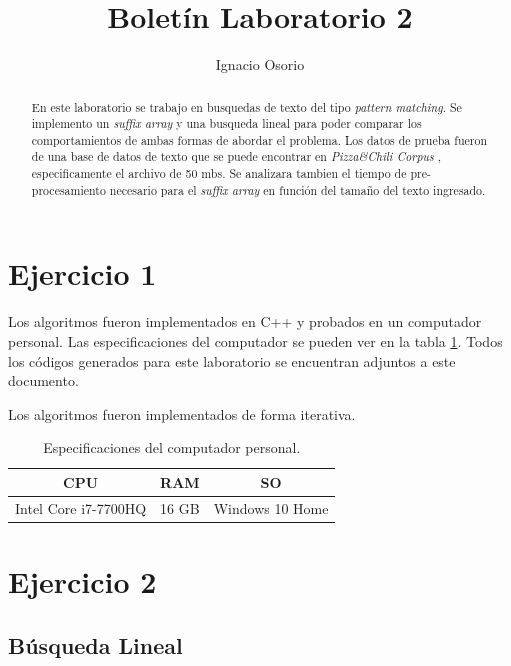 \documentclass[]{article}
\title{Boletín Laboratorio 2}
\author{Ignacio Osorio}
\begin{document}
\maketitle

\begin{abstract}

En este laboratorio se trabajo en busquedas de texto del tipo \emph{pattern matching}. Se implemento un \emph{suffix array} \cite{SuffixArray} y una busqueda lineal para poder comparar los comportamientos de ambas formas de abordar el problema. Los datos de prueba fueron de una base de datos de texto que se puede encontrar en \emph{Pizza&Chili Corpus} \cite{data}, especificamente el archivo de 50 mbs. Se analizara tambien el tiempo de pre-procesamiento necesario para el \emph{suffix array} en función del tamaño del texto ingresado.

\end{abstract}

\section{Ejercicio 1}








Los algoritmos fueron implementados en C++ y probados en un computador personal. Las especificaciones del computador se pueden ver en la tabla \ref{tab:spec}. Todos los códigos generados para este laboratorio se encuentran adjuntos a este documento.

Los algoritmos fueron implementados de forma iterativa.

\begin{table}[]
	\centering
	\caption{Especificaciones del computador personal.}
	\label{tab:spec}
	\begin{tabular}{|c|c|c|}
		\hline
		CPU 					& RAM 			& SO 	 				\\ \hline
		Intel Core i7-7700HQ    & 16 GB        	& Windows 10 Home        \\ \hline
	\end{tabular}
\end{table}


\section{Ejercicio 2}
\subsection{Búsqueda Lineal}
\end{document}
